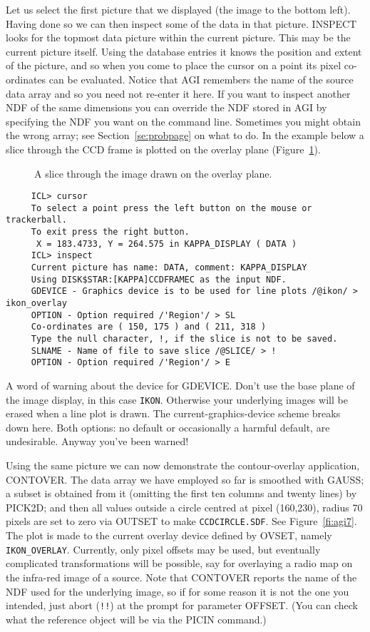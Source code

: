 {Let us select the first picture that we displayed (the image to the
bottom left).  Having done so we can then inspect some of the data
in that picture.  INSPECT looks for the topmost data picture within
the current picture.  This may be the current picture itself. Using
the database entries it knows the position and extent of the picture,
and so when you come to place the cursor on a point its pixel co-ordinates
can be evaluated.  Notice that AGI remembers the name of the source
data array and so you need not re-enter it here.  If you want to inspect
another NDF of the same dimensions you can override the NDF stored
in AGI by specifying the NDF you want on the command line.  Sometimes
you might obtain the wrong array; see Section~\ref{se:probpage} on what
to do.  In the example below a slice through the CCD frame is plotted on
the overlay plane (Figure~\ref{fi:agi6}).

\begin{figure}[htb]
\caption{A slice through the image drawn on the overlay plane.}
\label{fi:agi6}
\vspace{4.4in}
\end{figure}

\small
\begin{verbatim}
     ICL> cursor
     To select a point press the left button on the mouse or trackerball.
     To exit press the right button.
      X = 183.4733, Y = 264.575 in KAPPA_DISPLAY ( DATA )
     ICL> inspect
     Current picture has name: DATA, comment: KAPPA_DISPLAY
     Using DISK$STAR:[KAPPA]CCDFRAMEC as the input NDF.
     GDEVICE - Graphics device is to be used for line plots /@ikon/ > ikon_overlay
     OPTION - Option required /'Region'/ > SL
     Co-ordinates are ( 150, 175 ) and ( 211, 318 )
     Type the null character, !, if the slice is not to be saved.
     SLNAME - Name of file to save slice /@SLICE/ > !
     OPTION - Option required /'Region'/ > E
\end{verbatim}
\normalsize
A word of warning about the device for GDEVICE.  Don't use the base
plane of the image display, in this case {\tt IKON}.  Otherwise
your underlying images will be erased when a line plot is drawn.
The current-graphics-device scheme breaks down here.  Both
options: no default or occasionally a harmful default,
are undesirable.  Anyway you've been warned!

Using the same picture we can now demonstrate the contour-overlay
application, CONTOVER.  The data array we have employed so far is
smoothed with GAUSS; a subset is obtained from it (omitting the first
ten columns and twenty lines) by PICK2D; and then all values outside a circle
centred at pixel (160,230), radius 70 pixels are set to zero via OUTSET
to make {\tt \mbox{CCDCIRCLE.SDF}}. See Figure~\ref{fi:agi7}.  The plot is made
to the current overlay device defined by OVSET, namely {\tt
IKON\_OVERLAY}. Currently, only pixel offsets may be used, but
eventually complicated transformations will be possible, say for
overlaying a radio map on the infra-red image of a source.
Note that CONTOVER reports the name of the NDF used for the underlying
image, so if for some reason it is not the one you intended, just abort
({\tt !!}) at the prompt for parameter OFFSET.  (You can check what
the reference object will be via the PICIN command.)

}
